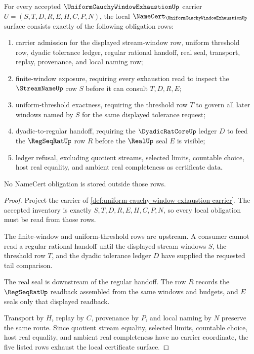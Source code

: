\begin{theorem}
\label{thm:uniform-cauchy-window-exhaustion}
For every accepted $\UniformCauchyWindowExhaustionUp$ carrier $U=(S,T,D,R,E,H,C,P,N)$, the local $\NameCert_{\UniformCauchyWindowExhaustionUp}$ surface consists exactly of the following obligation rows:
\begin{enumerate}
\item carrier admission for the displayed stream-window row, uniform threshold row, dyadic tolerance ledger, regular rational handoff, real seal, transport, replay, provenance, and local naming row;
\item finite-window exposure, requiring every exhaustion read to inspect the $\StreamNameUp$ row $S$ before it can consult $T,D,R,E$;
\item uniform-threshold exactness, requiring the threshold row $T$ to govern all later windows named by $S$ for the same displayed tolerance request;
\item dyadic-to-regular handoff, requiring the $\DyadicRatCoreUp$ ledger $D$ to feed the $\RegSeqRatUp$ row $R$ before the $\RealUp$ seal $E$ is visible;
\item ledger refusal, excluding quotient streams, selected limits, countable choice, host real equality, and ambient real completeness as certificate data.
\end{enumerate}
No NameCert obligation is stored outside those rows.
\end{theorem}
\begin{proof}
Project the carrier of \autoref{def:uniform-cauchy-window-exhaustion-carrier}. The accepted inventory is exactly $S,T,D,R,E,H,C,P,N$, so every local obligation must be read from those rows.

The finite-window and uniform-threshold rows are upstream. A consumer cannot read a regular rational handoff until the displayed stream windows $S$, the threshold row $T$, and the dyadic tolerance ledger $D$ have supplied the requested tail comparison.

The real seal is downstream of the regular handoff. The row $R$ records the $\RegSeqRatUp$ readback assembled from the same windows and budgets, and $E$ seals only that displayed readback.

Transport by $H$, replay by $C$, provenance by $P$, and local naming by $N$ preserve the same route. Since quotient stream equality, selected limits, countable choice, host real equality, and ambient real completeness have no carrier coordinate, the five listed rows exhaust the local certificate surface.
\end{proof}

